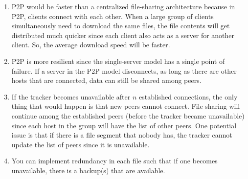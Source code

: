 \documentclass{report}
\begin{document}
\begin{problem}
\begin{answer}{40em}
  \begin{enumerate}[label=(\alph*)]
  \item P2P would be faster than a centralized file-sharing architecture because in P2P,
    clients connect with each other. When a large group of clients simultaneously need to download the
    same files, the file contents will get distributed much quicker since each client also acts as a
    server for another client. So, the average download speed will be faster.
  \item P2P is more resilient since the single-server model has a single point of failure. If a
    server in the P2P model disconnects, as long as there are other hosts that are connected, data
    can still be shared among peers.
  \item If the tracker becomes unavailable after $n$ established connections, the only thing that
    would happen is that new peers cannot connect. File sharing will continue among the established
    peers (before the tracker became unavailable) since each host in the group will have the list of
    other peers. One potential issue is that if there is a file segment that nobody has, the
    tracker cannot update the list of peers since it is unavailable.
  \item You can implement redundancy in each file such that if one becomes unavailable, there is a
    backup(s) that are available.
  \end{enumerate}

\end{answer}
\end{problem}

\newpage
\end{document}
